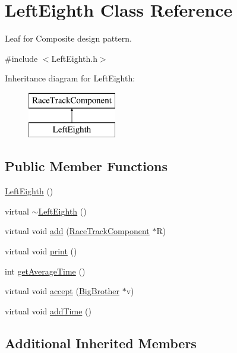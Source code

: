 \hypertarget{class_left_eighth}{}\section{Left\+Eighth Class Reference}
\label{class_left_eighth}


Leaf for Composite design pattern.  




{\ttfamily \#include $<$Left\+Eighth.\+h$>$}

Inheritance diagram for Left\+Eighth\+:\begin{figure}[H]
\begin{center}
\leavevmode
\includegraphics[height=2.000000cm]{class_left_eighth}
\end{center}
\end{figure}
\subsection*{Public Member Functions}
\begin{DoxyCompactItemize}
\item 
\mbox{\hyperlink{class_left_eighth_a185923e49b765f96ca16533a2b9608a4}{Left\+Eighth}} ()
\item 
virtual \mbox{\hyperlink{class_left_eighth_af4fffc0d115bf218223396c668653f2b}{$\sim$\+Left\+Eighth}} ()
\item 
virtual void \mbox{\hyperlink{class_left_eighth_a8b41dca112e41eda8ec47a5cf4675a3e}{add}} (\mbox{\hyperlink{class_race_track_component}{Race\+Track\+Component}} $\ast$R)
\item 
virtual void \mbox{\hyperlink{class_left_eighth_ae5167cfc8af05a977d751cd0838ea17e}{print}} ()
\item 
int \mbox{\hyperlink{class_left_eighth_a88a09e74c3c2b3246310931a58d133f5}{get\+Average\+Time}} ()
\item 
virtual void \mbox{\hyperlink{class_left_eighth_a82a8a792d82363e5852763df729e1d8a}{accept}} (\mbox{\hyperlink{class_big_brother}{Big\+Brother}} $\ast$v)
\item 
virtual void \mbox{\hyperlink{class_left_eighth_a2bbed3b19b9d9842c7aadebd048b1884}{add\+Time}} ()
\end{DoxyCompactItemize}
\subsection*{Additional Inherited Members}


